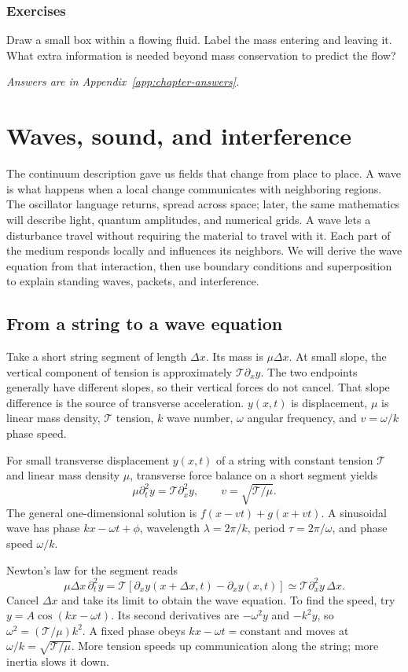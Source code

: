 \documentclass[11pt,oneside]{book}
\theoremstyle{reviewstyle}
\newcommand{\learningcheck}[1]{\subsection*{Exercises}\noindent #1\par\smallskip\noindent\emph{Answers are in Appendix~\ref{app:chapter-answers}.}}
\begin{document}
\learningcheck{Draw a small box within a flowing fluid. Label the mass entering and leaving it. What extra information is needed beyond mass conservation to predict the flow?}

\chapter{Waves, sound, and interference}
The continuum description gave us fields that change from place to place. A wave is what happens when a local change communicates with neighboring regions. The oscillator language returns, spread across space; later, the same mathematics will describe light, quantum amplitudes, and numerical grids.
A wave lets a disturbance travel without requiring the material to travel with it. Each part of the medium responds locally and influences its neighbors. We will derive the wave equation from that interaction, then use boundary conditions and superposition to explain standing waves, packets, and interference.

\section{From a string to a wave equation}
Take a short string segment of length $\Delta x$. Its mass is $\mu\Delta x$. At small slope, the vertical component of tension is approximately $\mathcal T\partial_xy$. The two endpoints generally have different slopes, so their vertical forces do not cancel. That slope difference is the source of transverse acceleration. $y(x,t)$ is displacement, $\mu$ is linear mass density, $\mathcal T$ tension, $k$ wave number, $\omega$ angular frequency, and $v=\omega/k$ phase speed.

For small transverse displacement $y(x,t)$ of a string with constant tension $\mathcal T$ and linear mass density $\mu$, transverse force balance on a short segment yields
\begin{equation}
\mu\partial_t^2y=\mathcal T\partial_x^2y,\qquad v=\sqrt{\mathcal T/\mu}.
\end{equation}
The general one-dimensional solution is $f(x-vt)+g(x+vt)$. A sinusoidal wave has phase $kx-\omega t+\phi$, wavelength $\lambda=2\pi/k$, period $\tau=2\pi/\omega$, and phase speed $\omega/k$.

Newton's law for the segment reads
\begin{equation}
\mu\Delta x\,\partial_t^2y
=\mathcal T[\partial_xy(x+\Delta x,t)-\partial_xy(x,t)]
\simeq\mathcal T\partial_x^2y\,\Delta x.
\end{equation}
Cancel $\Delta x$ and take its limit to obtain the wave equation. To find the speed, try $y=A\cos(kx-\omega t)$. Its second derivatives are $-\omega^2y$ and $-k^2y$, so $\omega^2=(\mathcal T/\mu)k^2$. A fixed phase obeys $kx-\omega t=\text{constant}$ and moves at $\omega/k=\sqrt{\mathcal T/\mu}$. More tension speeds up communication along the string; more inertia slows it down.
\end{document}
